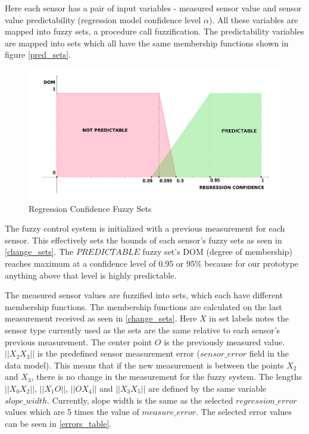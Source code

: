 Here each sensor has a pair of input variables - measured sensor value and sensor value predictability (regression model confidence level $\alpha$). All these variables are mapped into fuzzy sets, a procedure call fuzzification. The predictability variables are mapped into sets which all have the same membership functions shown in figure \autoref{pred_sets}.

\begin{figure}[h!]
\centering
\includegraphics[scale=0.58]{4/figures/pred_sets.pdf}
\caption{Regression Confidence Fuzzy Sets}
\label{pred_sets}
\end{figure}

The fuzzy control system is initialized with a previous measurement for each sensor. This effectively sets the bounds of each sensor's fuzzy sets as seen in \autoref{change_sets}. The $PREDICTABLE$ fuzzy set's DOM (degree of membership) reaches maximum at a confidence level of 0.95 or 95\% because for our prototype anything above that level is highly predictable. 

The measured sensor values are fuzzified into sets, which each have different membership functions. The membership functions are calculated on the last measurement received as seen in \autoref{change_sets}. Here $X$ in set labels notes the sensor type currently used as the sets are the same relative to each sensor's previous measurement. The center point $O$ is the previously measured value. $||X_2X_3||$ is the predefined sensor measurement error  ($sensor\_error$ field in the data model). This means that if the new measurement is between the points $X_2$ and $X_3$, there is no change in the measurement for the fuzzy system. The lengths $||X_0X_2||$, $||X_1O||$, $||OX_4||$ and $||X_3X_5||$ are defined by the same variable $slope\_width$. Currently, slope width is the same as the selected $regression\_error$ values which are 5 times the value of $measure\_error$. The selected error values can be seen in \autoref{errors_table}. 

